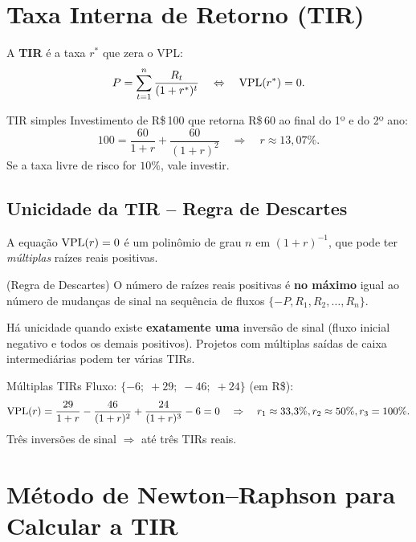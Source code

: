 \section{Taxa Interna de Retorno (TIR)}

\begin{definicao}
A \textbf{TIR} é a taxa $r^*$ que zera o VPL:
\[
  P = \sum_{t=1}^n \frac{R_t}{(1+r^*)^t}
  \quad\Leftrightarrow\quad
  \mathrm{VPL}(r^*) = 0.
\]
\end{definicao}

\begin{exemplo}{TIR simples}
Investimento de R\$\,100 que retorna R\$\,60 ao final do 1º e do 2º ano:
\[
  100 = \frac{60}{1+r} + \frac{60}{(1+r)^2}
  \quad\Rightarrow\quad r \approx 13{,}07\%.
\]
Se a taxa livre de risco for $10\%$, vale investir.
\end{exemplo}

\subsection{Unicidade da TIR -- Regra de Descartes}

A equação $\mathrm{VPL}(r) = 0$ é um polinômio de grau $n$ em $(1+r)^{-1}$, que pode ter
\emph{múltiplas} raízes reais positivas.

\begin{prop}
(Regra de Descartes) O número de raízes reais positivas é \textbf{no máximo} igual ao número de
mudanças de sinal na sequência de fluxos $\{-P, R_1, R_2, \ldots, R_n\}$.
\end{prop}

Há unicidade quando existe \textbf{exatamente uma} inversão de sinal (fluxo inicial negativo e
todos os demais positivos). Projetos com múltiplas saídas de caixa intermediárias podem ter
várias TIRs.

\begin{exemplo}{Múltiplas TIRs}
Fluxo: $\{-6;\; +29;\; -46;\; +24\}$ (em R\$):
\[
  \mathrm{VPL}(r) = \frac{29}{1+r} - \frac{46}{(1+r)^2} + \frac{24}{(1+r)^3} - 6 = 0
  \quad\Rightarrow\quad
  r_1 \approx 33{,}3\%, r_2 \approx 50\%, r_3 = 100\%.
\]
Três inversões de sinal $\Rightarrow$ até três TIRs reais.
\end{exemplo}

\section{Método de Newton--Raphson para Calcular a TIR}


